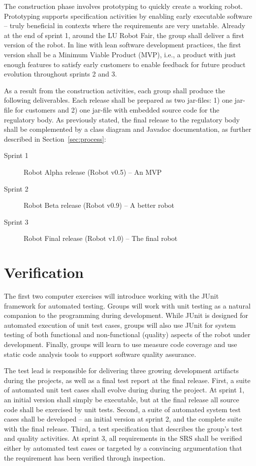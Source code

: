 \documentclass{scrreprt}
\begin{document}
\begin{description}
\end{description}

The construction phase involves prototyping to quickly create a working robot. Prototyping supports specification activities by enabling early executable software -- truly beneficial in contexts where the requirements are very unstable. Already at the end of sprint 1, around the LU Robot Fair, the group shall deliver a first version of the robot. In line with lean software development practices, the first version shall be a Minimum Viable Product (MVP), i.e., a product with just enough features to satisfy early customers to enable feedback for future product evolution throughout sprints 2 and 3. 

As a result from the construction activities, each group shall produce the following deliverables. Each release shall be prepared as two jar-files: 1) one jar-file for customers and 2) one jar-file with embedded source code for the regulatory body. As previously stated, the final release to the regulatory body shall be complemented by a class diagram and Javadoc documentation, as further described in Section~\ref{sec:process}:
\begin{description}
\item[Sprint 1] Robot Alpha release (Robot v0.5) -- An MVP
\item[Sprint 2] Robot Beta release (Robot v0.9) -- A better robot
\item[Sprint 3] Robot Final release (Robot v1.0) -- The final robot
\end{description}

\section{Verification}
The first two computer exercises will introduce working with the JUnit framework for automated testing. Groups will work with unit testing as a natural companion to the programming during development. While JUnit is designed for automated execution of unit test cases, groups will also use JUnit for system testing of both functional and non-functional (quality) aspects of the robot under development. Finally, groups will learn to use measure code coverage and use static code analysis tools to support software quality assurance.

The test lead is responsible for delivering three growing development artifacts during the projects, as well as a final test report at the final release. First, a suite of automated unit test cases shall evolve during during the project. At sprint 1, an initial version shall simply be executable, but at the final release all source code shall be exercised by unit tests. Second, a suite of automated system test cases shall be developed -- an initial version at sprint 2, and the complete suite with the final release. Third, a test specification that describes the group's test and quality activities. At sprint 3, all requirements in the SRS shall be verified either by automated test cases or targeted by a convincing argumentation that the requirement has been verified through inspection.
\end{document}
